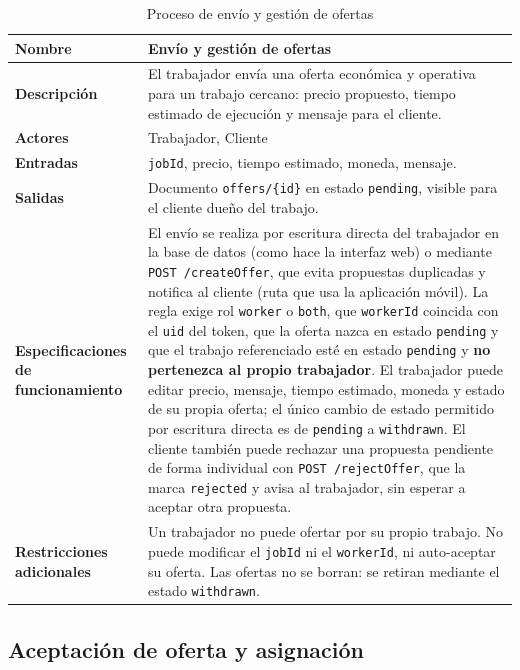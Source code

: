\documentclass[doc,12pt,a4paper]{apa7}
\begin{document}
\begin{longtable}{|P{3.3cm}|L{11.2cm}|}
\caption{Proceso de envío y gestión de ofertas}\\
\hline
\textbf{Nombre} & Envío y gestión de ofertas \\ \hline
\textbf{Descripción} & El trabajador envía una oferta económica y operativa para un trabajo cercano: precio propuesto, tiempo estimado de ejecución y mensaje para el cliente. \\ \hline
\textbf{Actores} & Trabajador, Cliente \\ \hline
\textbf{Entradas} & \texttt{jobId}, precio, tiempo estimado, moneda, mensaje. \\ \hline
\textbf{Salidas} & Documento \texttt{offers/\{id\}} en estado \texttt{pending}, visible para el cliente dueño del trabajo. \\ \hline
\textbf{Especificaciones de funcionamiento} & El envío se realiza por escritura directa del trabajador en la base de datos (como hace la interfaz web) o mediante \texttt{POST /createOffer}, que evita propuestas duplicadas y notifica al cliente (ruta que usa la aplicación móvil). La regla exige rol \texttt{worker} o \texttt{both}, que \texttt{workerId} coincida con el \texttt{uid} del token, que la oferta nazca en estado \texttt{pending} y que el trabajo referenciado esté en estado \texttt{pending} y \textbf{no pertenezca al propio trabajador}. El trabajador puede editar precio, mensaje, tiempo estimado, moneda y estado de su propia oferta; el único cambio de estado permitido por escritura directa es de \texttt{pending} a \texttt{withdrawn}. El cliente también puede rechazar una propuesta pendiente de forma individual con \texttt{POST /rejectOffer}, que la marca \texttt{rejected} y avisa al trabajador, sin esperar a aceptar otra propuesta. \\ \hline
\textbf{Restricciones adicionales} & Un trabajador no puede ofertar por su propio trabajo. No puede modificar el \texttt{jobId} ni el \texttt{workerId}, ni auto-aceptar su oferta. Las ofertas no se borran: se retiran mediante el estado \texttt{withdrawn}. \\ \hline
\end{longtable}

\subsection{Aceptación de oferta y asignación}
\end{document}
